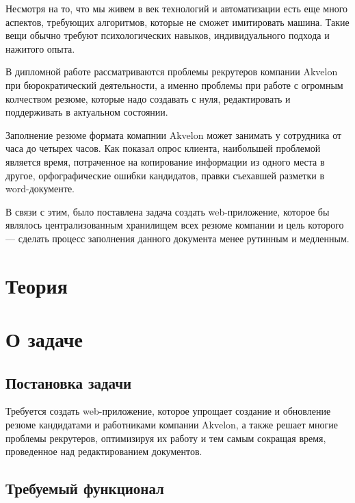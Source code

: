 \documentclass[a4paper,12pt]{diplom}
\begin{document}
\medskip

\tableofcontents[Содержание]


Несмотря на то, что мы живем в век технологий и автоматизации есть еще много аспектов, 
требующих алгоритмов, которые не сможет имитировать машина. Такие вещи обычно требуют 
психологических навыков, индивидуального подхода и нажитого опыта. 

В дипломной работе рассматриваются проблемы рекрутеров компании
 Akvelon при бюрократический деятельности, 
а именно проблемы при работе с огромным колчеством резюме, которые надо создавать с нуля, редактировать и
поддерживать в актуальном состоянии.

Заполнение резюме формата комапнии Akvelon
может занимать у сотрудника от часа до четырех часов. Как показал опрос клиента, наибольшей проблемой является время, потраченное
на копирование информации из одного места в другое, орфографические ошибки кандидатов, правки 
съехавшей разметки в word-документе.

В связи с этим, было поставлена задача создать web-приложение, которое бы являлось централизованным хранилищем
 всех резюме компании и цель которого — сделать процесс заполнения данного документа менее рутинным и медленным.

\chapter{Теория}

\chapter{О задаче}

\section{Постановка задачи}

Требуется создать web-приложение, которое упрощает создание и обновление резюме кандидатами и работниками компании Akvelon,
а также решает многие проблемы рекрутеров, оптимизируя их работу и тем самым сокращая время,
проведенное над редактированием документов.

\section{Требуемый функционал}
\end{document}
